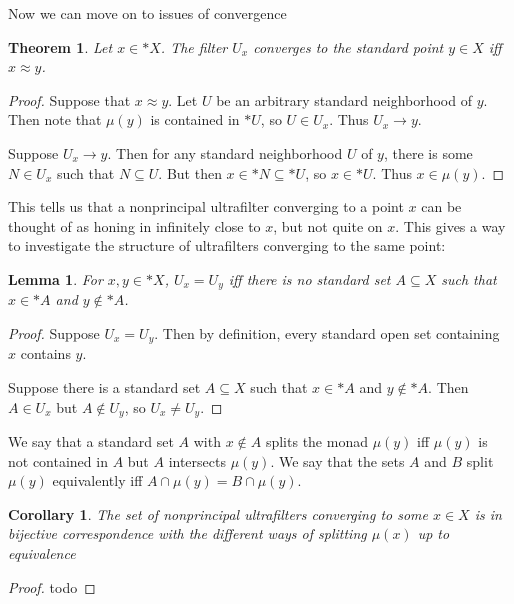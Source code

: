 \documentclass{article}
\newtheorem{theorem}{Theorem}
\newtheorem{corr}{Corollary}
\newtheorem{lemma}{Lemma}
\begin{document}
Now we can move on to issues of convergence
\begin{theorem}
  Let $x\in *X$.
  The filter $U_x$ converges to the standard point $y\in X$ iff $x\approx y$.
\end{theorem}
\begin{proof}
  Suppose that $x\approx y$. Let $U$ be an arbitrary standard neighborhood of $y$. Then note that $\mu(y)$ is contained in  $*U$, so $U\in U_x$. Thus $U_x\to y$.
  
  Suppose $U_x\to y$. Then for any standard neighborhood $U$ of $y$, there is some $N\in U_x$ such that $N\subseteq U$. But then $x\in *N\subseteq *U$, so $x\in *U$. Thus $x\in \mu(y)$.
\end{proof}
This tells us that a nonprincipal ultrafilter converging to a point $x$ can be thought of as honing in infinitely close to $x$, but not quite on $x$. This gives a way to investigate the structure of ultrafilters converging to the same point:
\begin{lemma}
  For $x,y\in*X$, $U_x=U_y$ iff there is no standard set $A\subseteq X$ such that $x\in *A$ and $y\notin *A$.
\end{lemma}
\begin{proof}
  Suppose $U_x=U_y$. Then by definition, every standard open set containing $x$ contains $y$.
  
  Suppose there is a standard set $A\subseteq X$ such that $x\in *A$ and $y\notin *A$. Then $A\in U_x$ but $A\notin U_y$, so $U_x\neq U_y$.
\end{proof}

We say that a standard set $A$ with $x\notin A$ splits the monad $\mu(y)$ iff $\mu(y)$ is not contained in $A$ but $A$ intersects $\mu(y)$. We say that the sets $A$ and $B$ split $\mu(y)$ equivalently iff $A\cap\mu(y)=B\cap\mu(y)$.

\begin{corr}
  The set of nonprincipal ultrafilters converging to some $x\in X$ is in bijective correspondence with the different ways of splitting $\mu(x)$ up to equivalence 
\end{corr}
\begin{proof}
  todo
\end{proof}
\end{document}
